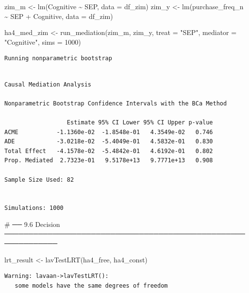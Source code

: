 \documentclass[
  letterpaper,
  DIV=11,
  numbers=noendperiod]{scrartcl}
\newenvironment{Shaded}{\begin{snugshade}}{\end{snugshade}}
\newcommand{\AttributeTok}[1]{\textcolor[rgb]{0.40,0.45,0.13}{#1}}
\newcommand{\CommentTok}[1]{\textcolor[rgb]{0.37,0.37,0.37}{#1}}
\newcommand{\DecValTok}[1]{\textcolor[rgb]{0.68,0.00,0.00}{#1}}
\newcommand{\FunctionTok}[1]{\textcolor[rgb]{0.28,0.35,0.67}{#1}}
\newcommand{\NormalTok}[1]{\textcolor[rgb]{0.00,0.23,0.31}{#1}}
\newcommand{\OtherTok}[1]{\textcolor[rgb]{0.00,0.23,0.31}{#1}}
\newcommand{\SpecialCharTok}[1]{\textcolor[rgb]{0.37,0.37,0.37}{#1}}
\newcommand{\StringTok}[1]{\textcolor[rgb]{0.13,0.47,0.30}{#1}}
\begin{document}
\begin{Shaded}
\begin{Highlighting}[]
\NormalTok{zim\_m }\OtherTok{\textless{}{-}} \FunctionTok{lm}\NormalTok{(Cognitive  }\SpecialCharTok{\textasciitilde{}}\NormalTok{ SEP, }\AttributeTok{data =}\NormalTok{ df\_zim)}
\NormalTok{zim\_y }\OtherTok{\textless{}{-}} \FunctionTok{lm}\NormalTok{(purchase\_freq\_n }\SpecialCharTok{\textasciitilde{}}\NormalTok{ SEP }\SpecialCharTok{+}\NormalTok{ Cognitive, }\AttributeTok{data =}\NormalTok{ df\_zim)}

\NormalTok{ha4\_med\_zim }\OtherTok{\textless{}{-}} \FunctionTok{run\_mediation}\NormalTok{(zim\_m, zim\_y, }\AttributeTok{treat =} \StringTok{"SEP"}\NormalTok{, }\AttributeTok{mediator =} \StringTok{"Cognitive"}\NormalTok{,}
                              \AttributeTok{sims =} \DecValTok{1000}\NormalTok{)}
\end{Highlighting}
\end{Shaded}

\begin{verbatim}
Running nonparametric bootstrap
\end{verbatim}

\begin{verbatim}

Causal Mediation Analysis 

Nonparametric Bootstrap Confidence Intervals with the BCa Method

                  Estimate 95% CI Lower 95% CI Upper p-value
ACME           -1.1360e-02  -1.8548e-01   4.3549e-02   0.746
ADE            -3.0218e-02  -5.4049e-01   4.5832e-01   0.830
Total Effect   -4.1578e-02  -5.4842e-01   4.6192e-01   0.802
Prop. Mediated  2.7323e-01   9.5178e+13   9.7771e+13   0.908

Sample Size Used: 82 


Simulations: 1000 
\end{verbatim}

\begin{Shaded}
\begin{Highlighting}[]
\CommentTok{\# ── 9.6  Decision ─────────────────────────────────────────────────────────────}

\NormalTok{lrt\_result }\OtherTok{\textless{}{-}} \FunctionTok{lavTestLRT}\NormalTok{(ha4\_free, ha4\_const)}
\end{Highlighting}
\end{Shaded}

\begin{verbatim}
Warning: lavaan->lavTestLRT():  
   some models have the same degrees of freedom
\end{verbatim}
\end{document}

